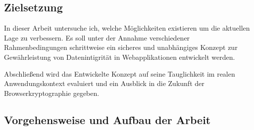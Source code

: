 \subsection{Zielsetzung}

In dieser Arbeit untersuche ich, welche Möglichkeiten existieren um die aktuellen Lage zu verbessern. Es soll unter der Annahme verschiedener Rahmenbedingungen schrittweise ein sicheres und unabhängiges Konzept zur Gewährleistung von Datenintigrität in Webapplikationen entwickelt werden.

Abschließend wird das Entwickelte Konzept auf seine Tauglichkeit im realen Anwendungskontext evaluiert und ein Ausblick in die Zukunft der Browserkryptographie gegeben.



\subsection{Vorgehensweise und Aufbau der Arbeit}
\tbd


